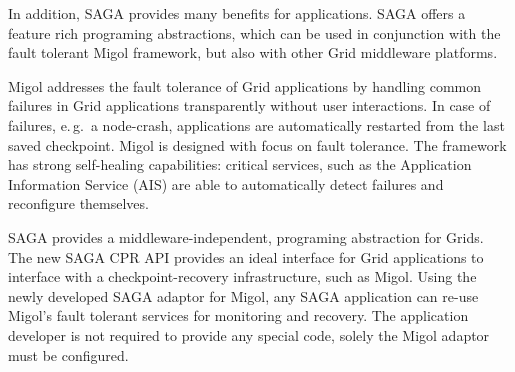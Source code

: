 \documentclass[times, 10pt,twocolumn]{article}
\begin{document}
In addition, SAGA provides many benefits for applications.  SAGA offers a feature rich programing abstractions, which can be used in conjunction with the fault tolerant Migol framework, but also with other Grid middleware platforms.




Migol addresses the fault tolerance of Grid applications by handling common failures 
in Grid applications transparently without user interactions.  In case of failures, 
e.\,g.\ a node-crash, applications are automatically restarted 
from the last saved checkpoint.   
Migol is designed with focus on fault tolerance. 
The framework has strong self-healing capabilities: critical services, 
such as the Application Information Service (AIS) are
able to automatically detect failures and reconfigure themselves. 

SAGA provides a middleware-independent, programing abstraction for Grids. The new 
SAGA CPR API provides an ideal interface for Grid applications to interface with 
a checkpoint-recovery infrastructure, such as Migol. Using the newly developed SAGA adaptor for 
Migol, any SAGA application can re-use Migol's fault tolerant services for monitoring and recovery.
The application developer is not required to provide any special code, solely the Migol adaptor must be
configured.




\end{document}
